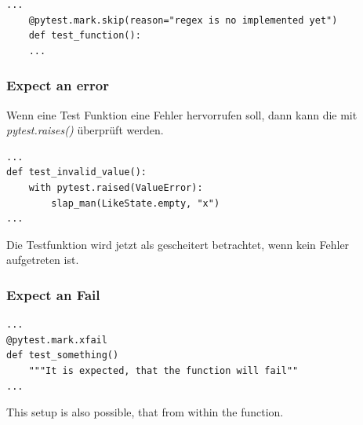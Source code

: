\begin{lstlisting}[style=python, caption={Bsp.: Skip a test function}, captionpos=b]
	...
	@pytest.mark.skip(reason="regex is no implemented yet")
	def test_function():
	...
\end{lstlisting}

\subsubsection{Expect an error}
Wenn eine Test Funktion eine Fehler hervorrufen soll, dann kann die mit \textit{pytest.raises()} überprüft werden.

\begin{lstlisting}[style=python, caption={Bsp.: Expect an erro a test function}, captionpos=b]
...
def test_invalid_value():
	with pytest.raised(ValueError):
		slap_man(LikeState.empty, "x")
...
\end{lstlisting}
Die Testfunktion wird jetzt als gescheitert betrachtet, wenn kein Fehler aufgetreten ist.

\subsubsection{Expect an Fail}
\begin{lstlisting}[style=python, caption={Bsp.: Expect an erro a test function}, captionpos=b]
...
@pytest.mark.xfail
def test_something()
	"""It is expected, that the function will fail""
...
\end{lstlisting}
This setup is also possible, that from within the function.

